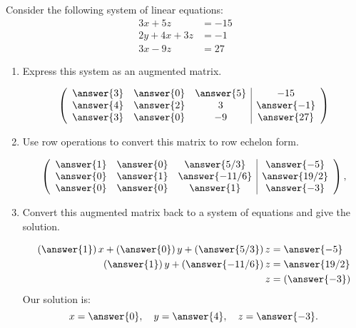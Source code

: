 \documentclass[handout]{ximera}
\author{Parisa Fatheddin}
\begin{document}
\begin{exercise}
Consider the following system of linear equations:
\begin{align*}
      3x + 5z &=  -15 \\
     2y+4x+3z&= -1\\
     3x -9z&= 27
\end{align*}
\begin{enumerate}
\item Express this system as an augmented matrix.
\begin{prompt}
\[
\left(\begin{array}{ccc|c}
  \answer{3} &  \answer{0} & \answer{5} &-15 \\
  \answer{4} & \answer{2} & 3 & \answer{-1} \\
  \answer{3} &  \answer{0} & -9 & \answer{27}
\end{array}\right)
\]
\end{prompt}
\item Use row operations to convert this matrix to row echelon form.
\begin{prompt}
\[
\left(\begin{array}{ccc|c}
  \answer{1} &  \answer{0} & \answer{5/3} &\answer{-5} \\
  \answer{0} & \answer{1} & \answer{-11/6} & \answer{19/2} \\
  \answer{0} &  \answer{0} & \answer{1} & \answer{-3}
\end{array}\right),
\]
\end{prompt}
\item Convert this augmented matrix back to a system of equations
and give the solution.
\begin{prompt}
\begin{align*}
      \left(\answer{1}\right)x + \left(\answer{0}\right)y + \left(\answer{5/3}\right)z &= \answer{-5} \\
     \left(\answer{1}\right)y+\left(\answer{-11/6}\right)z&=\answer{19/2}\\
     z&=\left(\answer{-3}\right)
\end{align*}
Our solution is:
\[
x= \answer{0}, \quad y= \answer{4}, \quad z=\answer{-3}.
\]
\end{prompt}
\end{enumerate}
\end{exercise}
\end{document}
